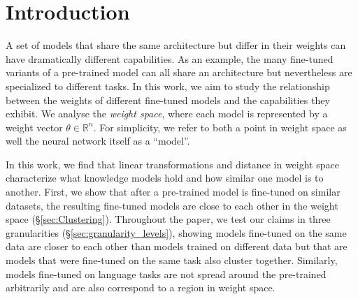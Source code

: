 \documentclass[nohyperref]{article}
\theoremstyle{plain}
\theoremstyle{definition}
\theoremstyle{remark}
\begin{document}
\section{Introduction}
A set of models that share the same architecture but differ in their weights can have dramatically different capabilities.
As an example, the many fine-tuned variants of a pre-trained model can all share an architecture but nevertheless are specialized to different tasks.
In this work, we aim to study the relationship between the weights of different fine-tuned models and the capabilities they exhibit. We analyse the \emph{weight space}, where each model is represented by a weight vector $\theta \in \mathbb{R}^n$. For simplicity, we refer to both a point in weight space as well the neural network itself as a ``model''.


In this work, we find that linear transformations and distance in weight space characterize what knowledge models hold and how similar one model is to another.
First, we show that after a pre-trained model is fine-tuned on similar datasets, the resulting fine-tuned models are close to each other in the weight space (\S\ref{sec:Clustering}). Throughout the paper, we test our claims in three granularities (\S\ref{sec:granularity_levels}), showing models fine-tuned on the same data are closer to each other than models trained on different data but that are models that were fine-tuned on the same task also cluster together. Similarly, models fine-tuned on language tasks are not spread around the pre-trained arbitrarily and are also correspond to a region in weight space.

\end{document}
